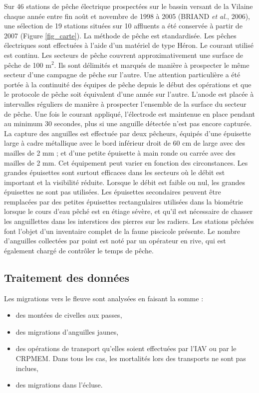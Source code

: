 \documentclass[10pt,twocolumn,titlepage,twoside]{article}\usepackage[]{graphicx}\usepackage[]{color}
\begin{document}
Sur 46 stations de pêche électrique
prospectées sur le bassin versant de la Vilaine chaque année entre
fin août et novembre de 1998 à 2005
(BRIAND \textit{ et
al.}, 2006), une sélection de 19 stations
situées sur 10 affluents a été conservée à partir de 2007
(Figure \ref{fig_carte}). La
méthode de pêche est standardisée. Les pêches électriques
sont effectuées à l'aide d'un
matériel de type Héron. Le courant utilisé est continu. Les secteurs de pêche
couvrent approximativement une surface de pêche de 100 m$^2$.
Ils sont délimités et marqués de manière à prospecter le
même secteur d'une campagne de pêche sur
l'autre. Une attention particulière a été portée à la continuité des
équipes de pêche depuis le début des opérations et que le protocole de pêche
soit équivalent d'une année sur l'autre.
L'anode est placée à intervalles réguliers de
manière à prospecter l'ensemble de la surface du
secteur de pêche. Une fois le courant appliqué,
l'électrode est maintenue en place pendant au minimum
30 secondes, plus si une anguille détectée n'est
pas encore capturée. La capture des anguilles est effectuée par
deux pêcheurs, équipés d'une épuisette large
à cadre métallique avec le bord inférieur droit de 60 cm de large
avec des mailles de 2 mm ; et d'une petite épuisette
à main ronde ou carrée avec des mailles de 2 mm. Cet équipement
peut varier en fonction des circonstances. Les grandes épuisettes
sont surtout efficaces dans les secteurs où le débit est important
et la visibilité réduite. Lorsque le débit est faible ou nul, les
grandes épuisettes ne sont pas utilisées. Les épuisettes
secondaires peuvent être remplacées par des petites épuisettes
rectangulaires utilisées dans la biométrie lorsque le cours
d'eau pêché est en étiage sévère, et
qu'il est nécessaire de
 \og chasser \fg les anguillettes dans les
interstices des pierres sur les radiers. Les stations pêchées font
l'objet d'un inventaire complet de la
faune piscicole présente. Le nombre d'anguilles
collectées par point est noté par un opérateur en rive, qui est
également chargé de contrôler le temps de pêche.

\subsection{Traitement des données}
Les migrations vers le fleuve sont analysées en faisant la somme :
\begin{itemize}
\item des montées de civelles aux passes,
\item des migrations d'anguilles jaunes,
\item des opérations de transport qu'elles soient effectuées par l'IAV ou par le
CRPMEM. Dans tous les cas, les mortalités lors des transports ne sont pas
inclues,
\item des migrations dans l'écluse.
\end{itemize}
\end{document}
